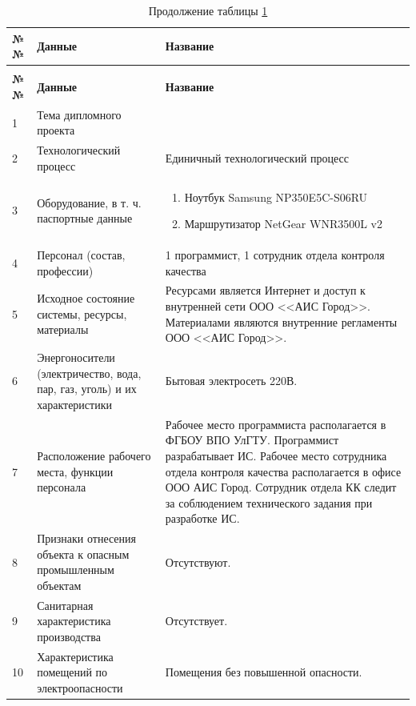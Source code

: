 \begin{footnotesize}
\begin{longtable}[h]{|p{}|p{}|p{}|}
	\caption{\label{tab:ecol-source}Исходные данные для проектирования} \\
	\hline
		\textbf{№№} &
		\textbf{Данные} &
		\textbf{Название} \\
	\hline \endfirsthead
	\caption*{Продолжение таблицы \ref{tab:ecol-source}}\\
	\hline
		\textbf{№№} &
		\textbf{Данные} &
		\textbf{Название} \\
	\hline \endhead
		1 & 
		Тема дипломного проекта &
		\WorkName \\
	\hline
		2 & 
		Технологический процесс &
		Единичный технологический процесс \\
	\hline
		3 & 
		Оборудование, в т. ч. паспортные данные &
		\begin{enumerate}
			\item Ноутбук Samsung NP350E5C-S06RU 
			\item Маршрутизатор NetGear WNR3500L v2
		\end{enumerate} \\
	\hline
		4 & 
		Персонал (состав, профессии) &
		1 программист, 1 сотрудник отдела контроля качества \\
	\hline
		5 & 
		Исходное состояние системы, ресурсы, материалы &
		Ресурсами является Интернет и доступ к внутренней сети ООО <<АИС Город>>.
		Материалами являются внутренние регламенты ООО <<АИС Город>>.\\
	\hline
		6 & 
		Энергоносители (электричество, вода, пар, газ, уголь) и их характеристики &
		Бытовая электросеть 220В. \\
	\hline
		7 & 
		Расположение рабочего места, функции персонала &
		Рабочее место программиста располагается в ФГБОУ ВПО УлГТУ.
		Программист разрабатывает ИС. \newline
		Рабочее место сотрудника отдела контроля качества располагается в офисе ООО АИС Город.
		Сотрудник отдела КК следит за соблюдением технического задания при разработке ИС. \\
	\hline
		8 & 
		Признаки отнесения объекта к опасным промышленным объектам &
		Отсутствуют. \\
	\hline
		9 & 
		Санитарная характеристика производства &
		Отсутствует. \\
	\hline
		10 & 
		Характеристика помещений по электроопасности &
		Помещения без повышенной опасности. \\

\end{longtable}
\end{footnotesize}
